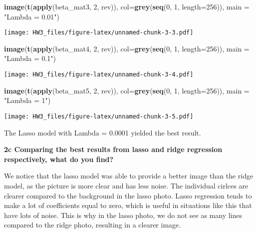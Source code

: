 \documentclass[
]{article}
\newenvironment{Shaded}{\begin{snugshade}}{\end{snugshade}}
\newcommand{\DataTypeTok}[1]{\textcolor[rgb]{0.13,0.29,0.53}{#1}}
\newcommand{\DecValTok}[1]{\textcolor[rgb]{0.00,0.00,0.81}{#1}}
\newcommand{\KeywordTok}[1]{\textcolor[rgb]{0.13,0.29,0.53}{\textbf{#1}}}
\newcommand{\NormalTok}[1]{#1}
\newcommand{\StringTok}[1]{\textcolor[rgb]{0.31,0.60,0.02}{#1}}
\begin{document}
\begin{Shaded}
\begin{Highlighting}[]
\KeywordTok{image}\NormalTok{(}\KeywordTok{t}\NormalTok{(}\KeywordTok{apply}\NormalTok{(beta_mat3, }\DecValTok{2}\NormalTok{, rev)), }\DataTypeTok{col=}\KeywordTok{grey}\NormalTok{(}\KeywordTok{seq}\NormalTok{(}\DecValTok{0}\NormalTok{, }\DecValTok{1}\NormalTok{, }\DataTypeTok{length=}\DecValTok{256}\NormalTok{)), }\DataTypeTok{main =} \StringTok{"Lambda = 0.01"}\NormalTok{)}
\end{Highlighting}
\end{Shaded}

\texttt{[image: HW3\_files/figure-latex/unnamed-chunk-3-3.pdf]}

\begin{Shaded}
\begin{Highlighting}[]
\KeywordTok{image}\NormalTok{(}\KeywordTok{t}\NormalTok{(}\KeywordTok{apply}\NormalTok{(beta_mat4, }\DecValTok{2}\NormalTok{, rev)), }\DataTypeTok{col=}\KeywordTok{grey}\NormalTok{(}\KeywordTok{seq}\NormalTok{(}\DecValTok{0}\NormalTok{, }\DecValTok{1}\NormalTok{, }\DataTypeTok{length=}\DecValTok{256}\NormalTok{)), }\DataTypeTok{main =} \StringTok{"Lambda = 0.1"}\NormalTok{)}
\end{Highlighting}
\end{Shaded}

\texttt{[image: HW3\_files/figure-latex/unnamed-chunk-3-4.pdf]}

\begin{Shaded}
\begin{Highlighting}[]
\KeywordTok{image}\NormalTok{(}\KeywordTok{t}\NormalTok{(}\KeywordTok{apply}\NormalTok{(beta_mat5, }\DecValTok{2}\NormalTok{, rev)), }\DataTypeTok{col=}\KeywordTok{grey}\NormalTok{(}\KeywordTok{seq}\NormalTok{(}\DecValTok{0}\NormalTok{, }\DecValTok{1}\NormalTok{, }\DataTypeTok{length=}\DecValTok{256}\NormalTok{)), }\DataTypeTok{main =} \StringTok{"Lambda = 1"}\NormalTok{)}
\end{Highlighting}
\end{Shaded}

\texttt{[image: HW3\_files/figure-latex/unnamed-chunk-3-5.pdf]}

The Lasso model with Lambda = 0.0001 yielded the best result.

\textbf{2c Comparing the best results from lasso and ridge regression
respectively, what do you find?}

We notice that the lasso model was able to provide a better image than
the ridge model, as the picture is more clear and has less noise. The
individual cirlces are clearer compared to the background in the lasso
photo. Lasso regression tends to make a lot of coefficients equal to
zero, which is useful in situations like this that have lots of noise.
This is why in the lasso photo, we do not see as many lines compared to
the ridge photo, resulting in a clearer image.
\end{document}
